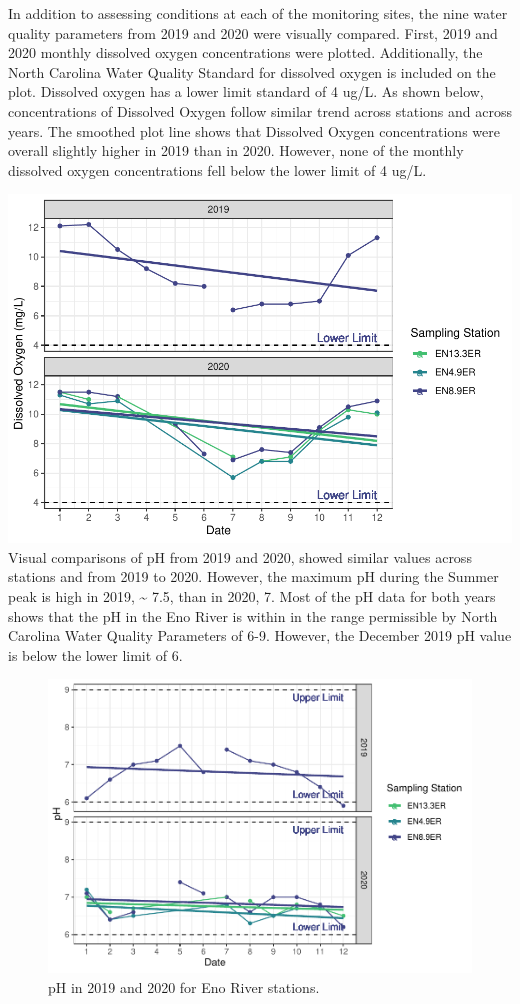 \documentclass[
  12pt,
]{article}
\begin{document}
In addition to assessing conditions at each of the monitoring sites, the
nine water quality parameters from 2019 and 2020 were visually compared.
First, 2019 and 2020 monthly dissolved oxygen concentrations were
plotted. Additionally, the North Carolina Water Quality Standard for
dissolved oxygen is included on the plot. Dissolved oxygen has a lower
limit standard of 4 ug/L. As shown below, concentrations of Dissolved
Oxygen follow similar trend across stations and across years. The
smoothed plot line shows that Dissolved Oxygen concentrations were
overall slightly higher in 2019 than in 2020. However, none of the
monthly dissolved oxygen concentrations fell below the lower limit of 4
ug/L.

\includegraphics{August_Lindborg_ENV872_Project_files/figure-latex/unnamed-chunk-5-1.pdf}
Visual comparisons of pH from 2019 and 2020, showed similar values
across stations and from 2019 to 2020. However, the maximum pH during
the Summer peak is high in 2019, \textasciitilde{} 7.5, than in 2020, 7.
Most of the pH data for both years shows that the pH in the Eno River is
within in the range permissible by North Carolina Water Quality
Parameters of 6-9. However, the December 2019 pH value is below the
lower limit of 6.

\begin{figure}
\centering
\includegraphics{August_Lindborg_ENV872_Project_files/figure-latex/unnamed-chunk-6-1.pdf}
\caption{pH in 2019 and 2020 for Eno River stations.}
\end{figure}
\end{document}
